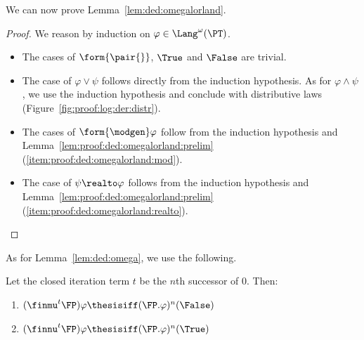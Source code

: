 We can now prove Lemma~\ref{lem:ded:omegalorland}.

\LemOmegaLorLand*

\begin{proof}
We reason by induction on $\varphi \in \Lang^\omega(\PT)$.
\begin{itemize}
\item
The cases of $\form{\pair{}}$, $\True$ and $\False$ are trivial.

\item
The case of $\varphi \lor \psi$ follows directly from the induction hypothesis.
As for $\varphi \land \psi$, we use the induction hypothesis
and conclude with distributive laws (Figure~\ref{fig:proof:log:der:distr}).

\item
The cases of $\form{\modgen}\varphi$ follow from
the induction hypothesis and
Lemma~\ref{lem:proof:ded:omegalorland:prelim}(\ref{item:proof:ded:omegalorland:mod}).

\item
The case of $\psi \realto \varphi$ follows from
the induction hypothesis and
Lemma~\ref{lem:proof:ded:omegalorland:prelim}(\ref{item:proof:ded:omegalorland:realto}).
\qedhere
\end{itemize}
\end{proof}


As for Lemma~\ref{lem:ded:omega},
we use the following.

\begin{lemma}
\label{lem:proof:ded:neutralomega:prelim}
Let the closed iteration term $t$ be the $n$th successor of $0$.
Then:
\begin{enumerate}[(1)]
\item
\label{item:proof:ded:neutralomega:mu}
\(
  (\finmu^t \FP)\varphi
  \thesisiff
  (\FP. \varphi)^n(\False)
\)

\item
\label{item:proof:ded:neutralomega:nu}
\(
  (\finnu^t \FP)\varphi
  \thesisiff
  (\FP. \varphi)^n(\True)
\)
\end{enumerate}
\end{lemma}

